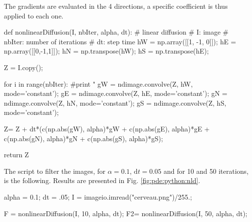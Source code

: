 The gradients are evaluated in the 4 directions, a specific coefficient is thus applied to each one.
\begin{python}
def nonlinearDiffusion(I, nbIter, alpha, dt):
    # linear diffusion
    # I: image
    # nbIter: number of iterations
    # dt: step time
    hW = np.array([[1, -1, 0]]);
    hE = np.array([[0,-1,1]]);
    hN = np.transpose(hW);
    hS = np.transpose(hE);
    
    Z = I.copy();
    
    for i in range(nbIter):
        #print "%
        gW = ndimage.convolve(Z, hW, mode='constant');
        gE = ndimage.convolve(Z, hE, mode='constant');
        gN = ndimage.convolve(Z, hN, mode='constant');
        gS = ndimage.convolve(Z, hS, mode='constant');
               
        Z= Z + dt*(c(np.abs(gW), alpha)*gW + c(np.abs(gE), alpha)*gE 
        + c(np.abs(gN), alpha)*gN + c(np.abs(gS), alpha)*gS);
    
    return Z
\end{python}

The script to filter the images, for $\alpha = 0.1$, $\textrm{d}t=0.05$ and for 10 and 50 iterations, is the following. Results are presented in Fig. \ref{fig:pde:python:nld}.

\begin{python}
alpha = 0.1;
dt = .05;
I = imageio.imread("cerveau.png")/255.;

F = nonlinearDiffusion(I, 10, alpha, dt);
F2= nonlinearDiffusion(I, 50, alpha, dt);
\end{python}

